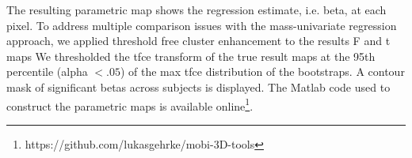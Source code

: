 The resulting parametric map shows the regression estimate, i.e. beta, at each pixel. To address multiple comparison issues with the mass-univariate regression approach, we applied threshold free cluster enhancement to the results F and t maps %
We thresholded the tfce transform of the true result maps at the 95th percentile (alpha $< .05$) of the max tfce distribution of the bootstraps. A contour mask of significant betas across subjects is displayed. The Matlab code used to construct the parametric maps is available online\footnote{https://github.com/lukasgehrke/mobi-3D-tools}.